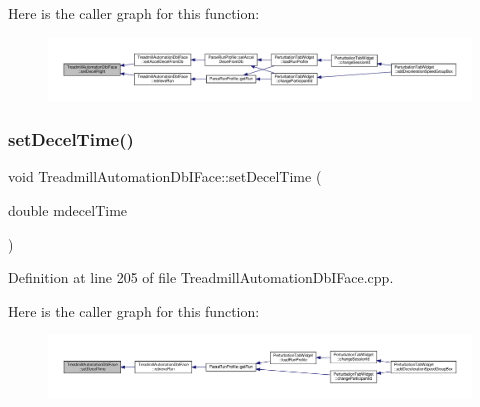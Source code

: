 Here is the caller graph for this function\+:
\nopagebreak
\begin{figure}[H]
\begin{center}
\leavevmode
\includegraphics[width=350pt]{class_treadmill_automation_db_i_face_a048ad2ac754cb27e929bf9c8a0c7ab21_icgraph}
\end{center}
\end{figure}
\mbox{\label{class_treadmill_automation_db_i_face_ad9921d5bae1050fdaf300076915733da}} 
\subsubsection{\texorpdfstring{set\+Decel\+Time()}{setDecelTime()}}
{\footnotesize\ttfamily void Treadmill\+Automation\+Db\+I\+Face\+::set\+Decel\+Time (\begin{DoxyParamCaption}\item[{double}]{mdecel\+Time }\end{DoxyParamCaption})}



Definition at line 205 of file Treadmill\+Automation\+Db\+I\+Face.\+cpp.

Here is the caller graph for this function\+:
\nopagebreak
\begin{figure}[H]
\begin{center}
\leavevmode
\includegraphics[width=350pt]{class_treadmill_automation_db_i_face_ad9921d5bae1050fdaf300076915733da_icgraph}
\end{center}
\end{figure}
\mbox{\label{class_treadmill_automation_db_i_face_a3a90027f63e3291ea36f4cc9c79dd896}} 
